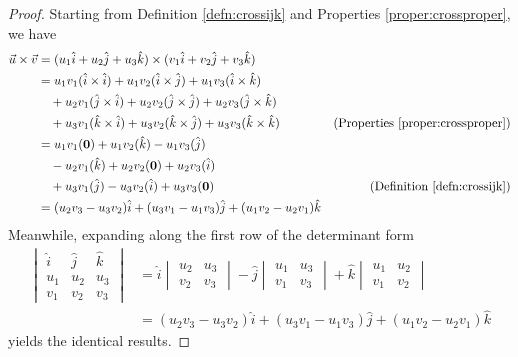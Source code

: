 \begin{proof}
Starting from Definition \ref{defn:crossijk} and Properties \ref{proper:crossproper}, we have
\begin{align*}
\vec{u} \times \vec{v} &= (u_1\hat{i} + u_2\hat{j} + u_3\hat{k}) \times (v_1\hat{i} + v_2\hat{j} + v_3\hat{k}) \\
&= u_1v_1(\hat{i}\times\hat{i}) + u_1v_2(\hat{i}\times\hat{j}) + u_1v_3(\hat{i}\times\hat{k}) \\
&\quad +u_2v_1(\hat{j}\times\hat{i}) + u_2v_2(\hat{j}\times\hat{j}) + u_2v_3(\hat{j}\times\hat{k}) \\
&\quad +u_3v_1(\hat{k}\times\hat{i}) + u_3v_2(\hat{k}\times\hat{j}) + u_3v_3(\hat{k}\times\hat{k}) & \text{(Properties \ref{proper:crossproper})}\\
&= u_1v_1(\textbf{0}) + u_1v_2(\hat{k}) - u_1v_3(\hat{j}) \\
&\quad -u_2v_1(\hat{k}) + u_2v_2(\textbf{0}) + u_2v_3(\hat{i}) \\
&\quad +u_3v_1(\hat{j}) - u_3v_2(\hat{i}) + u_3v_3(\textbf{0}) & \text{(Definition \ref{defn:crossijk})}\\
&= (u_2v_3 - u_3v_2)\hat{i} + (u_3v_1 - u_1v_3)\hat{j} + (u_1v_2 - u_2v_1)\hat{k} 
\end{align*}
Meanwhile, expanding along the first row of the determinant form
\begin{align*}
\begin{vmatrix}
\hat{i} & \hat{j} & \hat{k} \\
u_1 & u_2 & u_3 \\
v_1 & v_2 & v_3
\end{vmatrix} 
&= 
\hat{i}
\begin{vmatrix}
u_2 & u_3 \\
v_2 & v_3
\end{vmatrix} 
- \hat{j}
\begin{vmatrix}
u_1 & u_3 \\
v_1 & v_3
\end{vmatrix} 
+ \hat{k}
\begin{vmatrix}
u_1 & u_2 \\
v_1 & v_2
\end{vmatrix} \\
&= (u_2v_3 - u_3v_2)\hat{i} + (u_3v_1 - u_1v_3)\hat{j} + (u_1v_2 - u_2v_1)\hat{k}
\end{align*}
yields the identical results.
\end{proof}

